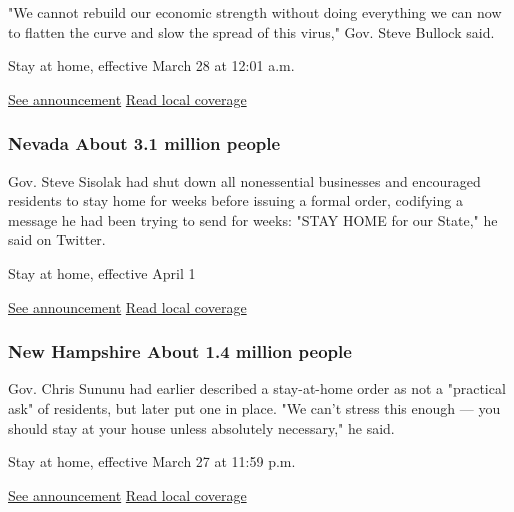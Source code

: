 "We cannot rebuild our economic strength without doing everything we can
now to flatten the curve and slow the spread of this virus," Gov. Steve
Bullock said.

Stay at home, effective March 28 at 12:01 a.m.

\href{https://covid19.mt.gov/Portals/223/Documents/Stay\%20at\%20Home\%20Directive.pdf?ver=2020-03-26-173332-177}{See
announcement} \textbar{}
\href{https://helenair.com/news/state-and-regional/govt-and-politics/montana-sees-first-covid--death-residents-ordered-to-stay/article_f92d251e-cfe6-5e99-ab9f-0aa9dd433b91.html}{Read
local coverage}

\hypertarget{nevada-about-31-million-people}{%
\subsubsection{Nevada About 3.1 million
people}\label{nevada-about-31-million-people}}

Gov. Steve Sisolak had shut down all nonessential businesses and
encouraged residents to stay home for weeks before issuing a formal
order, codifying a message he had been trying to send for weeks: "STAY
HOME for our State," he said on Twitter.

Stay at home, effective April 1

\href{https://nvhealthresponse.nv.gov/wp-content/uploads/2020/04/Declaration-of-Emergency-Directive-010-Stay-at-Home-3-31-20.pdf}{See
announcement} \textbar{}
\href{https://www.reviewjournal.com/news/politics-and-government/nevada/sisolak-issues-stay-at-home-order-1996415/}{Read
local coverage}

\hypertarget{new-hampshire-about-14-million-people}{%
\subsubsection{New Hampshire About 1.4 million
people}\label{new-hampshire-about-14-million-people}}

Gov. Chris Sununu had earlier described a stay-at-home order as not a
"practical ask" of residents, but later put one in place. "We can't
stress this enough --- you should stay at your house unless absolutely
necessary," he said.

Stay at home, effective March 27 at 11:59 p.m.

\href{https://www.governor.nh.gov/news-media/emergency-orders/documents/emergency-order-17-1.pdf}{See
announcement} \textbar{}
\href{https://www.concordmonitor.com/Thursday-update-NH-covid-cases-disease-spread-33554702}{Read
local coverage}

